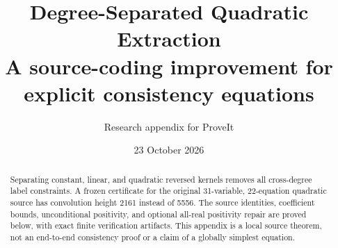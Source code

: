 \documentclass[10pt]{article}
\title{Degree-Separated Quadratic Extraction\\\large A source-coding improvement for explicit consistency equations}
\author{Research appendix for ProveIt}
\date{23 October 2026}
\begin{document}
\maketitle
\begin{abstract}
Separating constant, linear, and quadratic reversed kernels removes all
cross-degree label constraints.  A frozen certificate for the original
31-variable, 22-equation quadratic source has convolution height 2161 instead
of 5556.  The source identities, coefficient bounds, unconditional positivity,
and optional all-real positivity repair are proved below, with exact finite
verification artifacts.  This appendix is a local source theorem, not an
end-to-end consistency proof or a claim of a globally simplest equation.
\end{abstract}

\end{document}
